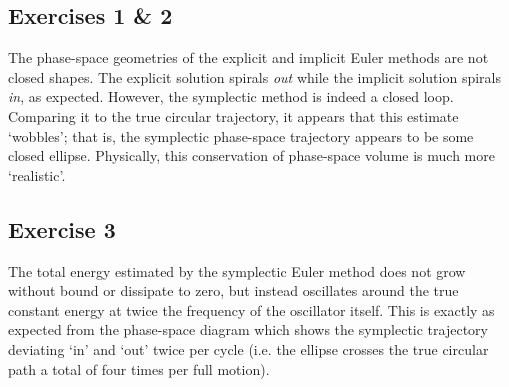 \documentclass{article}
\theoremstyle{definition}
\begin{document}
\subsection*{Exercises 1 \& 2}
The phase-space geometries of the explicit and implicit Euler methods are not closed shapes. The explicit solution spirals \textit{out} while the implicit solution spirals \textit{in}, as expected. However, the symplectic method is indeed a closed loop. Comparing it to the true circular trajectory, it appears that this estimate `wobbles'; that is, the symplectic phase-space trajectory appears to be some closed ellipse. Physically, this conservation of phase-space volume is much more `realistic'.

\subsection*{Exercise 3}
The total energy estimated by the symplectic Euler method does not grow without bound or dissipate to zero, but instead oscillates around the true constant energy at twice the frequency of the oscillator itself. This is exactly as expected from the phase-space diagram which shows the symplectic trajectory deviating `in' and `out' twice per cycle (i.e. the ellipse crosses the true circular path a total of four times per full motion). 
\end{document}
